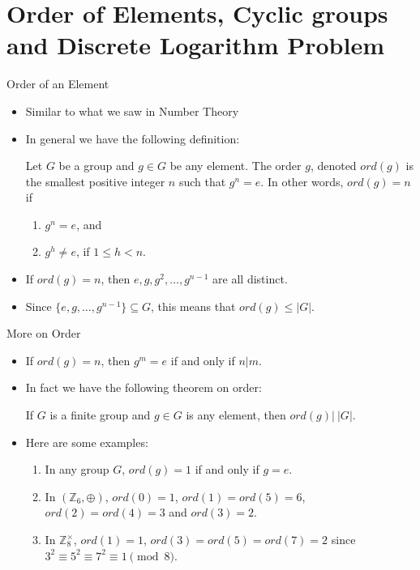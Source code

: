 \documentclass[ %
 10pt, xcolor={dvipsnames,svgnames,x11names,hyperref},
   hyperref={colorlinks=true,citecolor=green,linkcolor=DarkRed,urlcolor=ProcessBlue,anchorcolor=blue}
  ]{beamer}
\newenvironment{stepitemize}{\begin{itemize}[<+->]}{\end{itemize} }
\newcommand{\Z}{\mathbb{Z}}
\begin{document}
\section{Order of Elements, Cyclic groups and Discrete Logarithm Problem}
\begin{frame}{Order of an Element}
    \begin{stepitemize}
    \item Similar to what we saw in Number Theory
    \item In general we have the following definition:
    \begin{definition}
Let $G$ be a group and $g\in G$ be any element. The order $g$, denoted $ord(g)$ is the smallest positive integer $n$ such that $g^n=e$. In other words, $ord(g)=n$ if
\begin{enumerate}
    \item $g^n=e$, and
    \item $g^h\neq e$, if $1\leq h <n$.
\end{enumerate}
\end{definition}

\item[] \begin{lemma}\label{1}
If $ord(g) = n$, then $e, g, g^2, \dots, g^{n-1}$ are all distinct.
\end{lemma}

\item[] \begin{corollary}
Since $\{e,g, \dots, g^{n-1}\} \subseteq G$, this means that $ord(g)\leq |G|.$
\end{corollary}
\end{stepitemize}
\end{frame}
\begin{frame}{More on Order}
\begin{stepitemize}
    \item[] \begin{lemma}
If $ord(g)=n$, then $g^m=e$ if and only if $n|m$.
\end{lemma}
\item In fact we have the following theorem on order:
\begin{theorem}
If $G$ is a finite group and $g \in G$ is any element, then
$ord(g)| \: |G|$.
\end{theorem}
\item Here are some examples:
\begin{enumerate}
    \item In any group $G$, $ord(g)=1$ if and only if $g=e$.
    \item In $(\Z_6,\oplus)$, $ord (0)=1$, $ord(1)=ord(5)=6$, $ord(2)=ord(4)=3$ and $ord(3)=2$.
    \item In $\Z_{8}^{\times}$, $ord(1)=1$, $ord(3)=ord(5)=ord(7)=2$ since $3^2\equiv 5^2\equiv 7^2 \equiv 1 \pmod{8}$.
\end{enumerate}
\end{stepitemize}

\end{frame}
\end{document}
